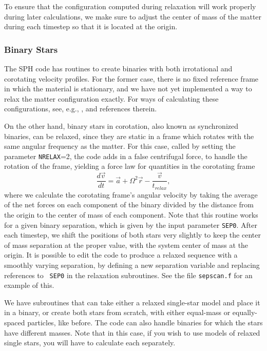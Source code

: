 To ensure that the configuration computed during relaxation will work
properly during later calculations, we make sure to adjust the center
of mass of the matter during each timestep so that it is located at
the origin.

\subsubsection{Binary Stars}
\label{nm:re:2s}
The SPH code has routines to create binaries with both irrotational
and corotating velocity profiles.  For the former case, there is no
fixed reference frame in which the material is stationary, and we have 
not yet implemented a way to relax the matter configuration exactly.
For ways of calculating these configurations, see, e.g.,
\citet{GGTMB,TGB,TG}, and references therein.  

On the other hand, 
binary stars in corotation, also known as synchronized binaries, can
be relaxed, since they are static in a frame which rotates
with the same angular frequency as the matter.  For this case, called
by setting the parameter {\tt NRELAX}=2, the
code adds in a false centrifugal force, to handle the rotation of the
frame, yielding a force law for quantities in the corotating frame
\begin{equation}
\frac{d\vec{v}}{dt}=\vec{a}+\Omega^2 \vec{r}-\frac{\vec{v}}{t_{relax}},
\label{eq:relax2}
\end{equation}
where we calculate the corotating frame's angular velocity by taking
the average of
the net forces on each component of the binary divided by the
distance from the origin to the center of mass of each component.   
Note that this routine works for a given binary separation, which is
given by the input parameter {\tt SEP0}.  After each timestep, we
shift the positions of both stars very slightly to keep the center of
mass separation at the proper value, with the system center of mass at
the origin.  It is possible to edit the
code to produce a relaxed sequence with a smoothly varying separation,
by defining a new separation variable and replacing references to {\tt
SEP0} in the relaxation subroutines.  See the file {\tt sepscan.f} for 
an example of this.

We have subroutines that can take either a relaxed single-star
model and place it in a binary, or create both stars from scratch,
with either equal-mass or equally-spaced particles, like before.  The
code can also handle binaries for which the stars have different
masses.  Note that in this case, if you wish to use models of relaxed
single stars, you will have to calculate each separately. 

